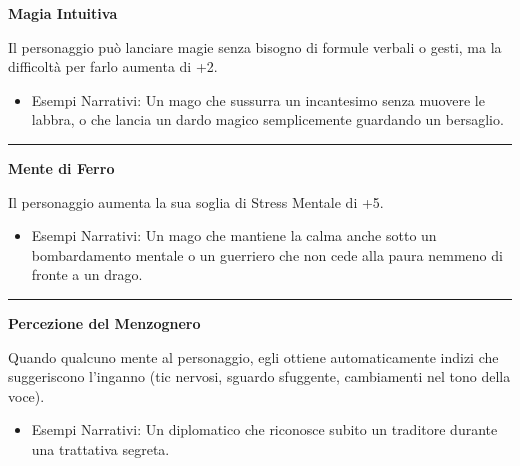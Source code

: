 \documentclass[../manuale_main.tex]{subfiles}
\begin{document}
\begin{center}
\textbf{\large{Magia Intuitiva}}\\
\end{center}
Il personaggio può lanciare magie senza bisogno di formule verbali o gesti, ma la difficoltà per farlo aumenta di +2.

\begin{itemize}
\item Esempi Narrativi: Un mago che sussurra un incantesimo senza muovere le labbra, o che lancia un dardo magico semplicemente guardando un bersaglio.
\end{itemize}

\vspace{0.5cm}
\noindent
\begin{center}
\rule{\textwidth}{0.4pt} 
\end{center}
\vspace{0.5cm}

\begin{center}
\textbf{\large{Mente di Ferro}}\\
\end{center}
Il personaggio aumenta la sua soglia di Stress Mentale di +5.

\begin{itemize}
\item Esempi Narrativi: Un mago che mantiene la calma anche sotto un bombardamento mentale o un guerriero che non cede alla paura nemmeno di fronte a un drago.
\end{itemize}

\vspace{0.5cm}
\noindent
\begin{center}
\rule{\textwidth}{0.4pt} 
\end{center}
\vspace{0.5cm}

\begin{center}
\textbf{\large{Percezione del Menzognero}}\\
\end{center}
Quando qualcuno mente al personaggio, egli ottiene automaticamente indizi che suggeriscono l’inganno (tic nervosi, sguardo sfuggente, cambiamenti nel tono della voce).

\begin{itemize}
\item Esempi Narrativi: Un diplomatico che riconosce subito un traditore durante una trattativa segreta.
\end{itemize}
\end{document}
